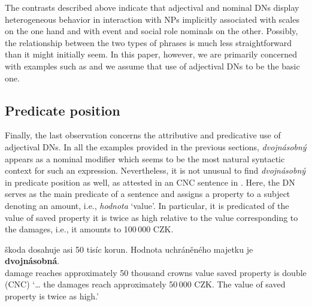 \documentclass[output=paper,modfonts,hidelinks,newtxmath
\ChapterDOI{10.5281/zenodo.2545513}
]{langscibook}
\begin{document}
\ea\label{dvojnasobny-asymmetry} 
\z \z

\noindent The contrasts described above indicate that adjectival and nominal DNs display heterogeneous behavior in interaction with NPs implicitly associated with scales on the one hand and with event and social role nominals on the other. Possibly, the relationship between the two types of phrases is much less straightforward than it might initially seem. In this paper, however, we are primarily concerned with examples such as  and we assume that use of adjectival DNs to be the basic one.

\subsection{Predicate position}\label{predicate-position}

Finally, the last observation concerns the attributive and predicative use of adjectival DNs. In all the examples provided in the previous sections, \textit{dvojnásobný} appears as a nominal modifier which seems to be the most natural syntactic context for such an expression. Nevertheless, it is not unusual to find \textit{dvojnásobný} in predicate position as well, as attested in an CNC sentence in . Here, the DN serves as the main predicate of a sentence and assigns a property to a subject denoting an amount, i.e., \textit{hodnota} `value'. In particular, it is predicated of the value of saved property it is twice as high relative to the value corresponding to the damages, i.e., it amounts to {100\,000 CZK}.

\ea \gll {\dots} škoda dosahuje asi 50 tisíc korun. Hodnota uchráněného majetku je \textbf{dvojnásobná}.\label{dvojnasobny-predicate}\\
{} damage reaches approximately 50 thousand crowns value saved property is double\\\hfill(CNC)
\glt `{\dots} the damages reach approximately 50\,000 CZK. The value of saved property is twice as high.'
\z
\end{document}
